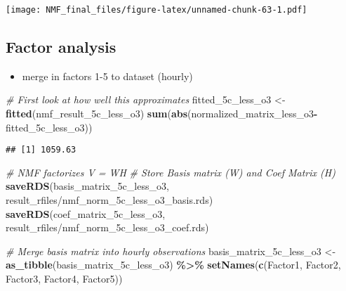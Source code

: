 \documentclass[
]{article}
\newenvironment{Shaded}{\begin{snugshade}}{\end{snugshade}}
\newcommand{\CommentTok}[1]{\textcolor[rgb]{0.56,0.35,0.01}{\textit{#1}}}
\newcommand{\FunctionTok}[1]{\textcolor[rgb]{0.13,0.29,0.53}{\textbf{#1}}}
\newcommand{\NormalTok}[1]{#1}
\newcommand{\OtherTok}[1]{\textcolor[rgb]{0.56,0.35,0.01}{#1}}
\newcommand{\SpecialCharTok}[1]{\textcolor[rgb]{0.81,0.36,0.00}{\textbf{#1}}}
\newcommand{\StringTok}[1]{\textcolor[rgb]{0.31,0.60,0.02}{#1}}
\providecommand{\tightlist}{%
  \setlength{\itemsep}{0pt}\setlength{\parskip}{0pt}}
\begin{document}
\texttt{[image: NMF\_final\_files/figure-latex/unnamed-chunk-63-1.pdf]}

\subsection{Factor analysis}\label{factor-analysis}

\begin{itemize}
\tightlist
\item
  merge in factors 1-5 to dataset (hourly)
\end{itemize}

\begin{Shaded}
\begin{Highlighting}[]
\CommentTok{\# First look at how well this approximates}
\NormalTok{fitted\_5c\_less\_o3 }\OtherTok{\textless{}{-}} \FunctionTok{fitted}\NormalTok{(nmf\_result\_5c\_less\_o3)}
\FunctionTok{sum}\NormalTok{(}\FunctionTok{abs}\NormalTok{(normalized\_matrix\_less\_o3}\SpecialCharTok{{-}}\NormalTok{fitted\_5c\_less\_o3))}
\end{Highlighting}
\end{Shaded}

\begin{verbatim}
## [1] 1059.63
\end{verbatim}

\begin{Shaded}
\begin{Highlighting}[]
\CommentTok{\# NMF factorizes V = WH}
\CommentTok{\# Store Basis matrix (W) and Coef Matrix (H)}
\FunctionTok{saveRDS}\NormalTok{(basis\_matrix\_5c\_less\_o3, }\StringTok{\textquotesingle{}result\_rfiles/nmf\_norm\_5c\_less\_o3\_basis.rds\textquotesingle{}}\NormalTok{)}
\FunctionTok{saveRDS}\NormalTok{(coef\_matrix\_5c\_less\_o3, }\StringTok{\textquotesingle{}result\_rfiles/nmf\_norm\_5c\_less\_o3\_coef.rds\textquotesingle{}}\NormalTok{)}

\CommentTok{\# Merge basis matrix into hourly observations}
\NormalTok{basis\_matrix\_5c\_less\_o3 }\OtherTok{\textless{}{-}} \FunctionTok{as\_tibble}\NormalTok{(basis\_matrix\_5c\_less\_o3) }\SpecialCharTok{\%\textgreater{}\%}
  \FunctionTok{setNames}\NormalTok{(}\FunctionTok{c}\NormalTok{(}\StringTok{\textquotesingle{}Factor1\textquotesingle{}}\NormalTok{, }\StringTok{\textquotesingle{}Factor2\textquotesingle{}}\NormalTok{, }\StringTok{\textquotesingle{}Factor3\textquotesingle{}}\NormalTok{, }\StringTok{\textquotesingle{}Factor4\textquotesingle{}}\NormalTok{, }\StringTok{\textquotesingle{}Factor5\textquotesingle{}}\NormalTok{))}
\end{Highlighting}
\end{Shaded}
\end{document}

